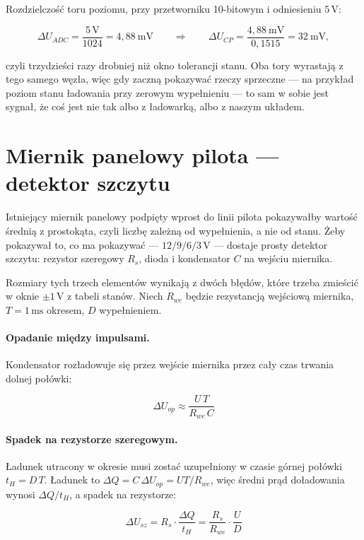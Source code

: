 \documentclass[a4paper,11pt]{article}
\newcommand{\volt}{\,\mathrm{V}}
\newcommand{\ms}{\,\mathrm{ms}}
\begin{document}
Rozdzielczość toru poziomu, przy przetworniku 10-bitowym i odniesieniu $5\volt$:

\[
\Delta U_{ADC}=\frac{5\volt}{1024}=4{,}88\ \mathrm{mV}
\qquad\Longrightarrow\qquad
\Delta U_{CP}=\frac{4{,}88\ \mathrm{mV}}{0{,}1515}=32\ \mathrm{mV},
\]

czyli trzydzieści razy drobniej niż okno tolerancji stanu. Oba tory wyrastają
z tego samego węzła, więc gdy zaczną pokazywać rzeczy sprzeczne --- na przykład
poziom stanu ładowania przy zerowym wypełnieniu --- to sam w sobie jest sygnał,
że coś jest nie tak albo z ładowarką, albo z naszym układem.

\section{Miernik panelowy pilota --- detektor szczytu}
\label{sec:szczyt}

Istniejący miernik panelowy podpięty wprost do linii pilota pokazywałby wartość
średnią z prostokąta, czyli liczbę zależną od wypełnienia, a nie od stanu. Żeby
pokazywał to, co ma pokazywać --- $12/9/6/3\volt$ --- dostaje prosty detektor
szczytu: rezystor szeregowy $R_s$, dioda i kondensator $C$ na wejściu miernika.

Rozmiary tych trzech elementów wynikają z dwóch błędów, które trzeba zmieścić
w oknie $\pm1\volt$ z tabeli stanów. Niech $R_{we}$ będzie rezystancją wejściową
miernika, $T=1\ms$ okresem, $D$ wypełnieniem.

\paragraph{Opadanie między impulsami.} Kondensator rozładowuje się przez wejście
miernika przez cały czas trwania dolnej połówki:

\begin{equation}
\Delta U_{op}\approx\frac{U\,T}{R_{we}\,C}
\label{eq:opadanie}
\end{equation}

\paragraph{Spadek na rezystorze szeregowym.} Ładunek utracony w okresie musi zostać
uzupełniony w czasie górnej połówki $t_H = D\,T$. Ładunek to
$\Delta Q = C\,\Delta U_{op} = U T/R_{we}$, więc średni prąd doładowania wynosi
$\Delta Q/t_H$, a spadek na rezystorze:

\begin{equation}
\Delta U_{sz}=R_s\cdot\frac{\Delta Q}{t_H}=\frac{R_s}{R_{we}}\cdot\frac{U}{D}
\label{eq:szereg}
\end{equation}
\end{document}

